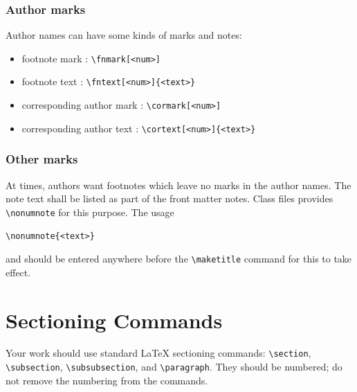 \documentclass[
]{ceurart}
\begin{document}
\subsubsection{Author marks}

Author names can have some kinds of marks and notes:
\begin{itemize}
  \item footnote mark : \verb|\fnmark[<num>]|
  \item footnote text : \verb|\fntext[<num>]{<text>}|
  \item corresponding author mark : \verb|\cormark[<num>]|
  \item corresponding author text : \verb|\cortext[<num>]{<text>}|
\end{itemize}

\subsubsection{Other marks}

At times, authors want footnotes which leave no marks in
the author names. The note text shall be listed as part of
the front matter notes. Class files provides
\verb|\nonumnote| for this purpose. The usage
\begin{lstlisting}
\nonumnote{<text>}
\end{lstlisting}
and should be entered anywhere before the \verb|\maketitle|
command for this to take effect.

\section{Sectioning Commands}

Your work should use standard \LaTeX{} sectioning commands:
\verb|\section|, \verb|\subsection|,
\verb|\subsubsection|, and
\verb|\paragraph|. They should be numbered; do not remove
the numbering from the commands.
\end{document}
